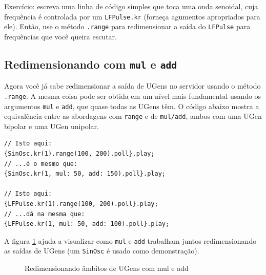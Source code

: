 Exercício: escreva uma linha de código simples que toca uma onda senoidal, cuja frequência é controlada por um \texttt{LFPulse.kr} (forneça agumentos apropriados para ele). Então, use o método \texttt{.range} para redimensionar a saída do \texttt{LFPulse} para frequências que você queira escutar. 

\subsection{Redimensionando com \texttt{mul} e \texttt{add}}

Agora você já sabe redimensionar a saída de UGens no servidor usando o método \texttt{.range}. A mesma coisa pode ser obtida em um nível mais fundamental usando os argumentos \texttt{mul} e \texttt{add}, que quase todas as UGens têm. O código abaixo mostra a equivalência entre as abordagens com \texttt{range} e de \texttt{mul/add}, ambos com uma UGen bipolar e uma UGen unipolar.

\begin{lstlisting}[style=SuperCollider-IDE, basicstyle=\scttfamily\footnotesize]
// Isto aqui:
{SinOsc.kr(1).range(100, 200).poll}.play;
// ...é o mesmo que:
{SinOsc.kr(1, mul: 50, add: 150).poll}.play;

// Isto aqui:
{LFPulse.kr(1).range(100, 200).poll}.play;
// ...dá na mesma que:
{LFPulse.kr(1, mul: 50, add: 100).poll}.play;
\end{lstlisting}

A figura \ref{fig:mul-add-scale} ajuda a visualizar como \texttt{mul} e \texttt{add} trabalham juntos redimensionando as saídas de UGens (um \texttt{SinOsc} é usado como demonstração).

\begin{figure}[h!]
\centerline{}
\caption{Redimensionando âmbitos de UGens com mul e add}
\label{fig:mul-add-scale}
\end{figure}

